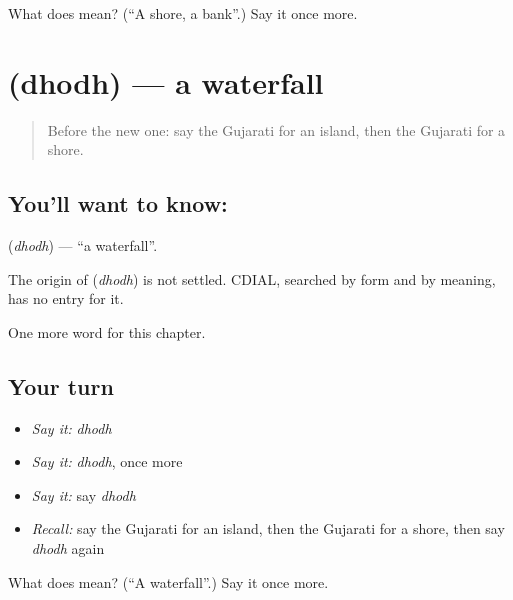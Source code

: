 \begin{tcolorbox}[breakable,colback=teal!4,colframe=teal!35!black,title={Before you move on}]
What does  mean? (\textquotedblleft{}A shore, a bank\textquotedblright{}.) Say it once more.
\end{tcolorbox}
\section[\texorpdfstring{\gu{ધોધ} (dhodh)}{ધોધ (dhodh)}]{ (dhodh) — a waterfall}

\label{lesson:GU-C119-dhodh}



\begin{quote}
Before the new one: say the Gujarati for an island, then the Gujarati for a shore.
\end{quote}

\subsection*{You'll want to know: }
\textbf{} (\emph{dhodh}) — \textquotedblleft{}a waterfall\textquotedblright{}.

\begin{cousinweb}
The origin of \textbf{} (\emph{dhodh}) is not settled. CDIAL, searched by form and by meaning, has no entry for it.
\end{cousinweb}

\begin{grammarlens}[title={What you've built}]
One more word for this chapter.
\end{grammarlens}

\subsection*{Your turn}
\begin{itemize}
\raggedright
  \item \emph{Say it:} \emph{dhodh}
  \item \emph{Say it:} \emph{dhodh}, once more
  \item \emph{Say it:} say \emph{dhodh}
  \item \emph{Recall:} say the Gujarati for an island, then the Gujarati for a shore, then say \emph{dhodh} again
\end{itemize}

\begin{tcolorbox}[breakable,colback=teal!4,colframe=teal!35!black,title={Before you move on}]
What does  mean? (\textquotedblleft{}A waterfall\textquotedblright{}.) Say it once more.
\end{tcolorbox}
